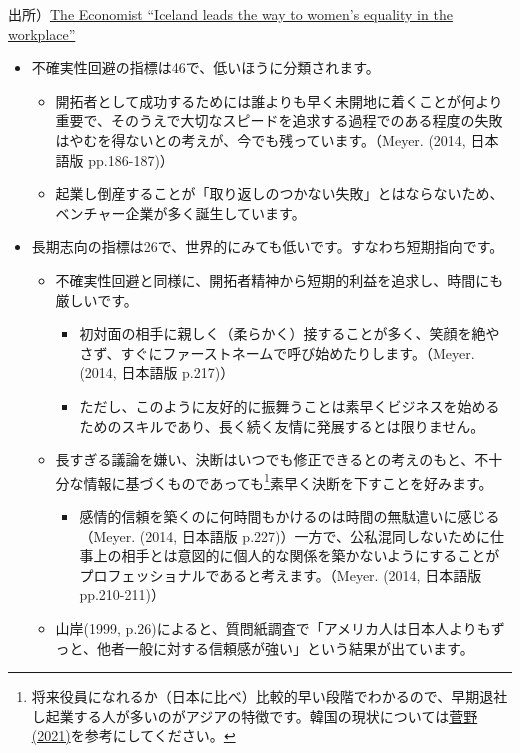 \documentclass[
]{book}
\providecommand{\tightlist}{%
  \setlength{\itemsep}{0pt}\setlength{\parskip}{0pt}}
\begin{document}
出所）\href{https://www.economist.com/graphic-detail/2020/03/04/iceland-leads-the-way-to-womens-equality-in-the-workplace}{The Economist ``Iceland leads the way to women's equality in the workplace''}

\begin{itemize}
\item
  不確実性回避の指標は46で、低いほうに分類されます。

  \begin{itemize}
  \item
    開拓者として成功するためには誰よりも早く未開地に着くことが何より重要で、そのうえで大切なスピードを追求する過程でのある程度の失敗はやむを得ないとの考えが、今でも残っています。（Meyer. (2014, 日本語版 pp.186-187)）
  \item
    起業し倒産することが「取り返しのつかない失敗」とはならないため、ベンチャー企業が多く誕生しています。
  \end{itemize}
\item
  長期志向の指標は26で、世界的にみても低いです。すなわち短期指向です。

  \begin{itemize}
  \item
    不確実性回避と同様に、開拓者精神から短期的利益を追求し、時間にも厳しいです。

    \begin{itemize}
    \item
      初対面の相手に親しく（柔らかく）接することが多く、笑顔を絶やさず、すぐにファーストネームで呼び始めたりします。（Meyer. (2014, 日本語版 p.217)）
    \item
      ただし、このように友好的に振舞うことは素早くビジネスを始めるためのスキルであり、長く続く友情に発展するとは限りません。
    \end{itemize}
  \item
    長すぎる議論を嫌い、決断はいつでも修正できるとの考えのもと、不十分な情報に基づくものであっても\footnote{将来役員になれるか（日本に比べ）比較的早い段階でわかるので、早期退社し起業する人が多いのがアジアの特徴です。韓国の現状については\href{https://toyokeizai.net/articles/-/473559}{菅野 (2021)}を参考にしてください。}素早く決断を下すことを好みます。

    \begin{itemize}
    \tightlist
    \item
      感情的信頼を築くのに何時間もかけるのは時間の無駄遣いに感じる（Meyer. (2014, 日本語版 p.227)）一方で、公私混同しないために仕事上の相手とは意図的に個人的な関係を築かないようにすることがプロフェッショナルであると考えます。（Meyer. (2014, 日本語版 pp.210-211)）
    \end{itemize}
  \item
    山岸(1999, p.26)によると、質問紙調査で「アメリカ人は日本人よりもずっと、他者一般に対する信頼感が強い」という結果が出ています。
  \end{itemize}
\end{itemize}
\end{document}
